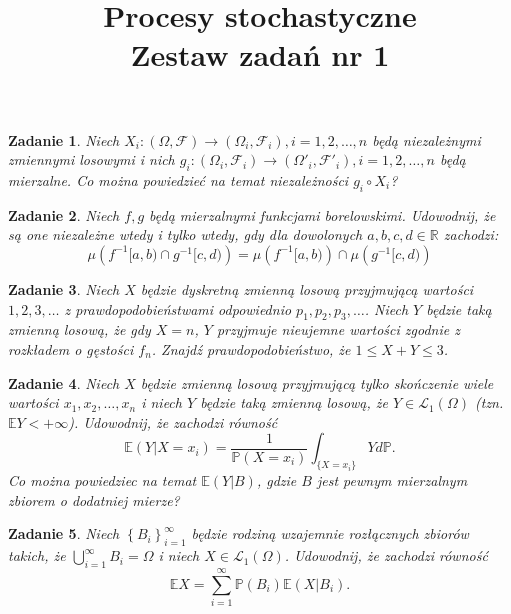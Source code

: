 \documentclass{mwart}
\title{Procesy stochastyczne\\ Zestaw zadań nr 1}
\newtheorem{zd}{Zadanie}
\begin{document}

\maketitle
\begin{zd}
Niech $X_i\colon \left(\Omega, \mathcal{F}\right) \to \left(\Omega_i, \mathcal{F}_i\right), i = 1, 2, \dots, n$ będą niezależnymi zmiennymi losowymi i nich $g_i\colon  \left(\Omega_i, \mathcal{F}_i\right) \to  \left(\Omega'_i, \mathcal{F}'_i\right), i = 1, 2, \dots, n$ będą mierzalne. Co można powiedzieć na temat niezależności $g_i\circ X_i$?
\end{zd}

\begin{zd}
Niech $f, g$ będą mierzalnymi funkcjami borelowskimi. Udowodnij, że są one niezależne wtedy i tylko wtedy, gdy dla dowolonych $a, b, c, d\in \mathbb{R}$ zachodzi:
\begin{displaymath}
\mu\left(f^{-1}[a, b)\cap g^{-1}[c, d)\right) = \mu\left(f^{-1}[a, b)\right)\cap \mu\left(g^{-1}[c, d)\right)
\end{displaymath}
\end{zd}

\begin{zd}
Niech $X$ będzie dyskretną zmienną losową przyjmującą wartości $1, 2, 3, \dots$ z prawdopodobieństwami odpowiednio $p_1, p_2, p_3, \dots$. Niech $Y$ będzie taką zmienną losową, że gdy $X=n$, $Y$ przyjmuje nieujemne wartości zgodnie z rozkładem o gęstości $f_n$. Znajdź prawdopodobieństwo, że $1\leq X+Y\leq 3$.
\end{zd}

\begin{zd}
Niech $X$ będzie zmienną losową przyjmującą tylko skończenie wiele wartości $x_1, x_2, \dots, x_n$ i niech $Y$ będzie taką zmienną losową, że $Y\in \mathcal{L}_1\left(\Omega\right)$ (tzn. $\mathbb{E}Y < +\infty$). Udowodnij, że zachodzi równość
\begin{displaymath}
\mathbb{E}\left(Y|X = x_i\right) = \frac{1}{\mathbb{P}\left(X = x_i\right)}\int_{\{X = x_i\}}Yd\mathbb{P}.
\end{displaymath}
Co można powiedziec na temat $\mathbb{E}\left(Y|B\right)$, gdzie $B$ jest pewnym mierzalnym zbiorem o dodatniej mierze?
\end{zd}

\begin{zd}
Niech $\left\{B_i\right\}_{i =1}^{\infty}$ będzie rodziną wzajemnie rozłącznych zbiorów takich, że $\bigcup_{i =1}^{\infty}B_i=\Omega$ i niech $X\in \mathcal{L}_1\left(\Omega\right)$. Udowodnij, że zachodzi równość
\begin{displaymath}
\mathbb{E}X = \sum_{i =1}^{\infty}\mathbb{P}(B_i)\mathbb{E}\left(X|B_i\right).
\end{displaymath}
\end{zd}
\end{document}
